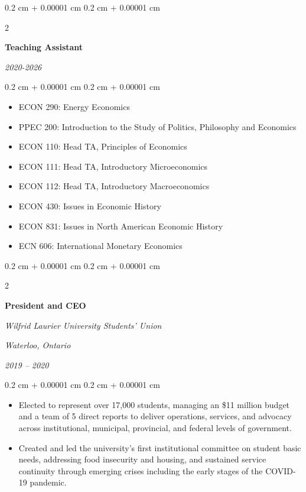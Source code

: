 \documentclass[10pt, letterpaper]{article}
\newenvironment{highlights}{
    \begin{itemize}[
        topsep=0.10 cm,
        parsep=0.10 cm,
        partopsep=0pt,
        itemsep=0pt,
        leftmargin=0.4 cm + 10pt
    ]
}{
    \end{itemize}
} %
\newenvironment{onecolentry}{
    \begin{adjustwidth}{
        0.2 cm + 0.00001 cm
    }{
        0.2 cm + 0.00001 cm
    }
}{
    \end{adjustwidth}
} %
\newenvironment{twocolentry}[2][]{
    \onecolentry
    \def\secondColumn{#2}
    \setcolumnwidth{\fill, 4.5 cm}
    \begin{paracol}{2}
}{
    \switchcolumn \raggedleft \secondColumn
    \end{paracol}
    \endonecolentry
} %
\begin{document}
\vspace{0.2 cm}

        \begin{twocolentry}{\textit{2020-2026}}
            \textbf{Teaching Assistant}
        \end{twocolentry}
        \begin{onecolentry}
            \begin{highlights}
                \item ECON 290: Energy Economics
                \item PPEC 200: Introduction to the Study of Politics, Philosophy and Economics
                \item ECON 110: Head TA, Principles of Economics
                \item ECON 111: Head TA, Introductory Microeconomics 
                \item ECON 112: Head TA, Introductory Macroeconomics
                \item ECON 430: Issues in Economic History
                \item ECON 831: Issues in North American Economic History
                \item ECN 606: International Monetary Economics
            \end{highlights}
        \end{onecolentry}

\vspace{0.2 cm}
            \begin{twocolentry}{
        \textit{Waterloo, Ontario}    
            
        \textit{2019 – 2020}
        }
            \textbf{President and CEO}
            
            \textit{Wilfrid Laurier University Students’ Union }
        \end{twocolentry}

        \vspace{0.10 cm}
        \begin{onecolentry}
            \begin{highlights}
                 \item Elected to represent over 17,000 students, managing an \$11 million budget and a team of 5 direct reports to deliver operations, services, and advocacy across institutional, municipal, provincial, and federal levels of government.
                \item Created and led the university's first institutional committee on student basic needs, addressing food insecurity and housing, and sustained service continuity through emerging crises including the early stages of the COVID-19 pandemic. 
            \end{highlights}
        \end{onecolentry}
\end{document}
